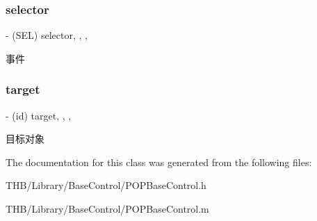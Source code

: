\subsubsection{\texorpdfstring{selector}{selector}}
{\footnotesize\ttfamily -\/ (S\+EL) selector\hspace{0.3cm}{\ttfamily [read]}, {\ttfamily [write]}, {\ttfamily [nonatomic]}, {\ttfamily [assign]}}

事件 \mbox{\label{interface_p_o_p_base_control_a5f6b7b05c669723d12f2729cda155937}} 
\subsubsection{\texorpdfstring{target}{target}}
{\footnotesize\ttfamily -\/ (id) target\hspace{0.3cm}{\ttfamily [read]}, {\ttfamily [write]}, {\ttfamily [nonatomic]}, {\ttfamily [weak]}}

目标对象 

The documentation for this class was generated from the following files\+:\begin{DoxyCompactItemize}
\item 
T\+H\+B/\+Library/\+Base\+Control/P\+O\+P\+Base\+Control.\+h\item 
T\+H\+B/\+Library/\+Base\+Control/P\+O\+P\+Base\+Control.\+m\end{DoxyCompactItemize}
